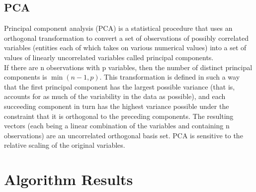\documentclass{article}
\begin{document}
\subsection{PCA}
Principal component analysis (PCA) is a statistical procedure that uses an orthogonal transformation to convert a set of observations of possibly correlated variables (entities each of which takes on various numerical values) into a set of values of linearly uncorrelated variables called principal components.\\ 
If there are n observations with p variables, then the number of distinct principal components is $\min(n-1,p)$. This transformation is defined in such a way that the first principal component has the largest possible variance (that is, accounts for as much of the variability in the data as possible), and each succeeding component in turn has the highest variance possible under the constraint that it is orthogonal to the preceding components. The resulting vectors (each being a linear combination of the variables and containing n observations) are an uncorrelated orthogonal basis set. PCA is sensitive to the relative scaling of the original variables.






\section{Algorithm Results}
\end{document}
